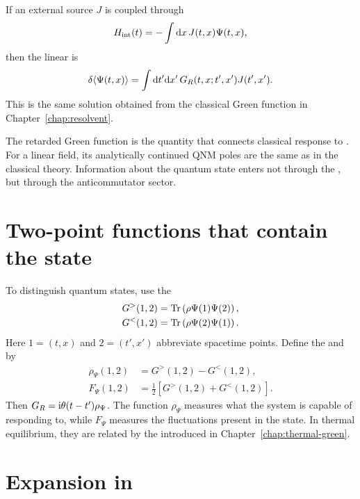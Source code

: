 If an external source $J$ is coupled through
\begin{equation}
H_{\mathrm{int}}(t)
=
-\int\mathrm{d} x\,J(t,x)\Psi(t,x),
\end{equation}
then the linear  is
\begin{equation}
\delta\langle\Psi(t,x)\rangle
=
\int\mathrm{d} t'\mathrm{d} x'\,
G_R(t,x;t',x')J(t',x').
\label{eq:kubo-master-response}
\end{equation}
This is the same solution obtained from the classical Green function in Chapter~\ref{chap:resolvent}.

\begin{principlebox}
The retarded Green function is the quantity that connects classical response to . For a linear field, its analytically continued QNM poles are the same as in the classical theory. Information about the quantum state enters not through the , but through the anticommutator sector.
\end{principlebox}

\section{Two-point functions that contain the state}

To distinguish quantum states, use the 
\begin{align}
G^>(1,2)
&=
\operatorname{Tr}\left(
\rho\Psi(1)\Psi(2)
\right),
\label{eq:wightman-greater}
\\
G^<(1,2)
&=
\operatorname{Tr}\left(
\rho\Psi(2)\Psi(1)
\right).
\label{eq:wightman-less}
\end{align}
Here $1=(t,x)$ and $2=(t',x')$ abbreviate spacetime points. Define the  and  by
\begin{align}
\rho_\Psi(1,2)
&=
G^>(1,2)-G^<(1,2),
\label{eq:master-spectral-function}
\\
F_\Psi(1,2)
&=
\frac{1}{2}
\left[
G^>(1,2)+G^<(1,2)
\right].
\label{eq:master-symmetric-correlator}
\end{align}
Then $G_R=\mathrm{i}\theta(t-t')\rho_\Psi$. The function $\rho_\Psi$ measures what the system is capable of responding to, while $F_\Psi$ measures the fluctuations present in the state. In thermal equilibrium, they are related by the  introduced in Chapter~\ref{chap:thermal-green}.

\section{Expansion in }

